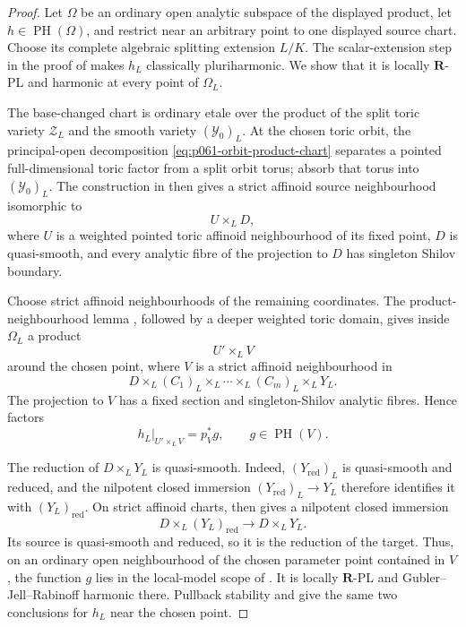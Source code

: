 \begin{proof}
Let $\Omega$ be an ordinary open analytic subspace of the displayed
product, let $h\in\operatorname{PH}(\Omega)$, and restrict near an arbitrary
point to one displayed source chart.  Choose its complete algebraic
splitting extension $L/K$.  The scalar-extension step in the proof of
 makes $h_L$
classically pluriharmonic.  We show that it is locally
$\mathbf R$-PL and harmonic at every point of $\Omega_L$.

The base-changed chart is ordinary etale over the product of the split toric
variety $\mathcal Z_L$ and the smooth variety $(\mathcal Y_0)_L$.  At the
chosen toric orbit, the principal-open decomposition
\eqref{eq:p061-orbit-product-chart} separates a pointed full-dimensional
toric factor from a split orbit torus; absorb that torus into
$(\mathcal Y_0)_L$.  The construction in
 then gives a strict affinoid source
neighbourhood isomorphic to
\[
                         U\times_LD,
\]
where $U$ is a weighted pointed toric affinoid neighbourhood of its fixed
point, $D$ is quasi-smooth, and every analytic fibre of the projection to
$D$ has singleton Shilov boundary.

Choose strict affinoid neighbourhoods of the remaining coordinates.  The
product-neighbourhood lemma , followed by
a deeper weighted toric domain, gives inside $\Omega_L$ a product
\[
                          U'\times_LV
\]
around the chosen point, where $V$ is a strict affinoid neighbourhood in
\[
 D\times_L(C_1)_L\times_L\cdots\times_L(C_m)_L\times_LY_L.
\]
The projection to $V$ has a fixed section and singleton-Shilov analytic
fibres.  Hence  factors
\[
                  h_L|_{U'\times_LV}=p_V^*g,
                  \qquad g\in\operatorname{PH}(V).
\]

The reduction of $D\times_LY_L$ is quasi-smooth.  Indeed,
$(Y_{\mathrm{red}})_L$ is quasi-smooth and reduced, and the nilpotent
closed immersion $(Y_{\mathrm{red}})_L\to Y_L$ therefore identifies it
with $(Y_L)_{\mathrm{red}}$.  On strict affinoid charts,
 then gives a nilpotent closed
immersion
\[
 D\times_L(Y_L)_{\mathrm{red}}
       \longrightarrow D\times_LY_L.
\]
Its source is quasi-smooth and reduced, so it is the reduction of the
target.  Thus, on an ordinary open neighbourhood of the chosen parameter
point contained in $V$, the function $g$ lies in the local-model scope of
.  It is locally
$\mathbf R$-PL and Gubler--Jell--Rabinoff harmonic there.  Pullback stability
\cite[Lemma~5.4(1)]{GJR26} and
 give the same two conclusions for
$h_L$ near the chosen point.


\end{proof}
